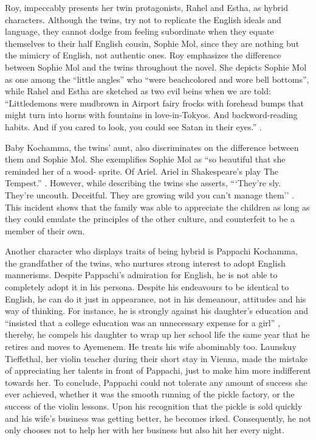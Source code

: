 Roy, impeccably presents her twin protagonists, Rahel and Estha, as hybrid characters. Although the twins, try not to replicate the English ideals and language, they cannot dodge from feeling subordinate when they equate themselves to their half English cousin, Sophie Mol, since they are nothing but the mimicry of English, not authentic ones. Roy emphasizes the difference between Sophie Mol and the twins throughout the novel. She depicts Sophie Mol as one among the ``little angles'' who ``were beachcolored and wore bell bottoms'', while Rahel and Estha are sketched as two evil beins when we are told: ``Littledemons were mudbrown in Airport fairy frocks with forehead bumps that might turn into horns with fountains in love-in-Tokyos. And backword-reading habits. And if you cared to look, you could see Satan in their eyes.'' \parencite[179]{Roy1997}. 

Baby Kochamma, the twins' aunt, also discriminates on the difference between them and Sophie Mol. She exemplifies Sophie Mol as ``so beautiful that she reminded her of a wood- sprite. Of Ariel. Ariel in Shakespeare's play The Tempest.'' \parencite[144]{Roy1997}. However, while describing the twins she asserts, ```They're sly. They're uncouth. Deceitful. They are growing wild you can't manage them'' \parencite[149]{Roy1997}. This incident shows that the family was able to appreciate the children as long as they could emulate the principles of the other culture, and counterfeit to be a member of their own. 

Another character who displays traits of being hybrid is \linebreak Pappachi Kochamma, the grandfather of the twins, who nurtures strong interest to adopt English mannerisms.  Despite Pappachi's admiration for English, he is not able to completely adopt it in his persona. Despite his endeavours to be identical to English, he can do it just in appearance, not in his demeanour, attitudes and his way of thinking. For instance, he is strongly against his daughter's education and ``insisted that a college education was an unnecessary expense for a girl'' \parencite[38]{Roy1997}, thereby, he compels his daughter to wrap up her school life the same year that he retires and moves to Ayemenem. He treats his wife abominably too. Launskuy Tieffethal, her violin teacher during their short stay in Vienna, made the mistake of appreciating her talents in front of Pappachi, just to make him more indifferent towards her. To conclude, Pappachi could not tolerate any amount of success she ever achieved, whether it was the smooth running of the pickle factory, or the success of the violin lessons. Upon his recognition that the pickle is sold quickly and his wife's business was getting better, he becomes irked. Consequently, he not only chooses not to help her with her business but also hit her every night. 

